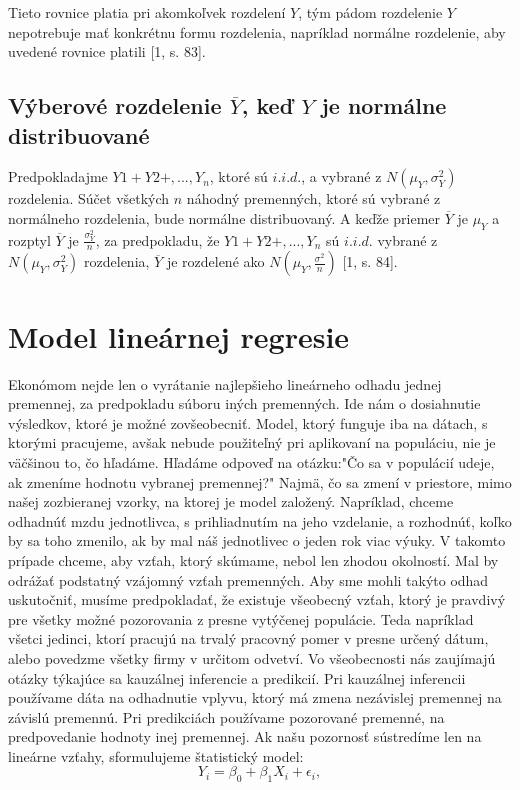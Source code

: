 \documentclass[]{tukediphc}
\begin{document}
Tieto rovnice platia pri akomkoľvek rozdelení $Y$, tým pádom rozdelenie $Y$ nepotrebuje mať konkrétnu formu rozdelenia, napríklad normálne rozdelenie, aby uvedené rovnice platili [1, s. 83].  

\subsection{Výberové rozdelenie $\overline{Y}$, keď $Y$ je normálne distribuované}

Predpokladajme $Y1 + Y2 +, ..., Y_n$, ktoré sú $i.i.d.$, a vybrané z $N(\mu_{Y}, \sigma^2_{Y})$ rozdelenia. Súčet všetkých $n$ náhodný premenných, ktoré sú vybrané z normálneho rozdelenia, bude normálne distribuovaný. A keďže priemer $\overline{Y}$ je $\mu_{Y}$ a rozptyl $\overline{Y}$ je $\frac{\sigma^2_Y}{n}$, za predpokladu, že $Y1 + Y2 +, ..., Y_n$ sú $i.i.d.$ vybrané z $N(\mu_{Y}, \sigma^2_{Y})$ rozdelenia, $\overline{Y}$ je rozdelené ako $N(\mu_{Y}, \frac{\sigma^2}{n})$ [1, s. 84].  
\newpage
\section{Model lineárnej regresie}

Ekonómom nejde len o vyrátanie najlepšieho lineárneho odhadu jednej premennej, za predpokladu súboru iných premenných. Ide nám o dosiahnutie výsledkov, ktoré je možné zovšeobecniť. Model, ktorý funguje iba na dátach, s ktorými pracujeme, avšak nebude použiteľný pri aplikovaní na populáciu, nie je väčšinou to, čo hľadáme. Hľadáme odpoveď na otázku:"Čo sa v populácií udeje, ak zmeníme hodnotu vybranej premennej?" Najmä, čo sa zmení v priestore, mimo našej zozbieranej vzorky, na ktorej je model založený. Napríklad, chceme odhadnúť mzdu jednotlivca, s prihliadnutím na jeho vzdelanie, a rozhodnúť, koľko by sa toho zmenilo, ak by mal náš jednotlivec o jeden rok viac výuky. V takomto prípade chceme, aby vzťah, ktorý skúmame, nebol len zhodou okolností. Mal by odrážať podstatný vzájomný vzťah premenných.  Aby sme mohli takýto odhad uskutočniť, musíme predpokladať, že existuje všeobecný vzťah, ktorý je pravdivý pre všetky možné pozorovania z presne vytýčenej populácie. Teda napríklad všetci jedinci, ktorí pracujú na trvalý pracovný pomer v presne určený dátum, alebo povedzme všetky firmy v určitom odvetví. Vo všeobecnosti nás zaujímajú otázky týkajúce sa kauzálnej inferencie a predikcií. Pri kauzálnej inferencii používame dáta na odhadnutie vplyvu, ktorý má zmena nezávislej premennej na závislú premennú. Pri predikciách používame pozorované premenné, na predpovedanie hodnoty inej premennej. Ak našu pozornosť sústredíme len na lineárne vzťahy, sformulujeme štatistický model: 
\begin{equation}
    Y_i = \beta_0 + \beta_{1} X_{i} + \epsilon_i,
\end{equation}
\end{document}
